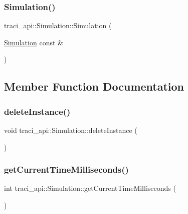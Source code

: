 \subsubsection{\texorpdfstring{Simulation()}{Simulation()}}
{\footnotesize\ttfamily traci\+\_\+api\+::\+Simulation\+::\+Simulation (\begin{DoxyParamCaption}\item[{\hyperlink{classtraci__api_1_1_simulation}{Simulation} const \&}]{ }\end{DoxyParamCaption})\hspace{0.3cm}{\ttfamily [delete]}}



\subsection{Member Function Documentation}
\mbox{\label{classtraci__api_1_1_simulation_a952c6f62a424d4f8d3ee016dc8c935bd}} 
\subsubsection{\texorpdfstring{delete\+Instance()}{deleteInstance()}}
{\footnotesize\ttfamily void traci\+\_\+api\+::\+Simulation\+::delete\+Instance (\begin{DoxyParamCaption}{ }\end{DoxyParamCaption})\hspace{0.3cm}{\ttfamily [static]}}

\mbox{\label{classtraci__api_1_1_simulation_a43ce3d282a312c2e6735cdcd4343b0a7}} 
\subsubsection{\texorpdfstring{get\+Current\+Time\+Milliseconds()}{getCurrentTimeMilliseconds()}}
{\footnotesize\ttfamily int traci\+\_\+api\+::\+Simulation\+::get\+Current\+Time\+Milliseconds (\begin{DoxyParamCaption}{ }\end{DoxyParamCaption})}

